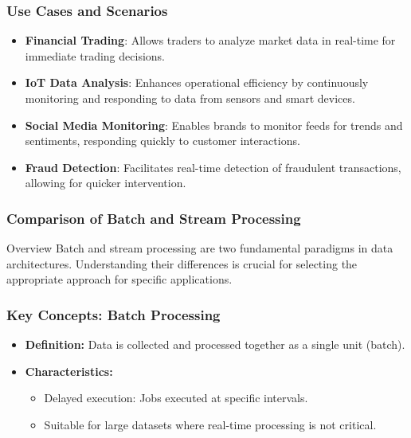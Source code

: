 \documentclass[aspectratio=169]{beamer}
\begin{document}
\begin{frame}[fragile]
    \frametitle{Use Cases and Scenarios}
    \begin{itemize}
        \item \textbf{Financial Trading}: Allows traders to analyze market data in real-time for immediate trading decisions.
        \item \textbf{IoT Data Analysis}: Enhances operational efficiency by continuously monitoring and responding to data from sensors and smart devices.
        \item \textbf{Social Media Monitoring}: Enables brands to monitor feeds for trends and sentiments, responding quickly to customer interactions.
        \item \textbf{Fraud Detection}: Facilitates real-time detection of fraudulent transactions, allowing for quicker intervention.
    \end{itemize}
\end{frame}

\begin{frame}[fragile]
    \frametitle{Comparison of Batch and Stream Processing}
    \begin{block}{Overview}
        Batch and stream processing are two fundamental paradigms in data architectures. Understanding their differences is crucial for selecting the appropriate approach for specific applications.
    \end{block}
\end{frame}

\begin{frame}[fragile]
    \frametitle{Key Concepts: Batch Processing}
    \begin{itemize}
        \item \textbf{Definition:} Data is collected and processed together as a single unit (batch).
        \item \textbf{Characteristics:}
            \begin{itemize}
                \item Delayed execution: Jobs executed at specific intervals.
                \item Suitable for large datasets where real-time processing is not critical.
            \end{itemize}
    \end{itemize}
\end{frame}
\end{document}
